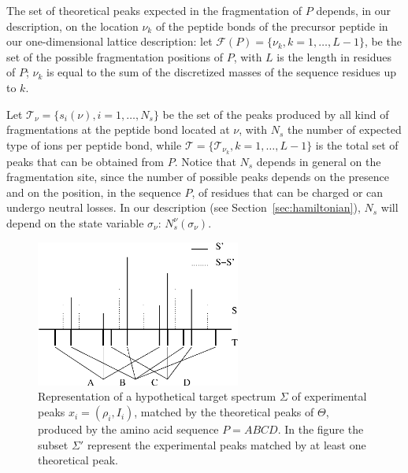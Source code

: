 The set of theoretical peaks expected in the fragmentation of %
$P$ depends, in our description, on the location $\nu_k$ of the peptide bonds of
the precursor peptide in our one-dimensional lattice description: let $\mathcal
F(P)= \{\nu_k,k=1,\dots,L-1\}$, be the set of the possible fragmentation
positions of $P$,  with $L$ is the length in residues of $P$;
$\nu_k$ is equal to  the sum of the discretized masses of
the sequence residues up to $k$. 
 
Let $\mathcal T_\nu=\{s_i(\nu),i=1,\dots,N_s\}$ be the set of the
peaks produced by all kind of fragmentations at the peptide bond located  at
$\nu$, with  $N_s$ the number of expected type of ions per peptide bond,
while $\mathcal T=\{\mathcal T_{\nu_k},k=1,\dots,L-1\}$ is 
the total set of peaks that can be obtained from  $P$.
Notice that $N_s$ depends in general on the fragmentation site, since the number
of possible peaks depends on the presence and on the position, in the sequence
$P$, of residues that can be charged or can undergo neutral losses. In our
description (see Section~\ref{sec:hamiltonian}), $N_s$ will depend on the state variable
$\sigma_\nu$: $N_s^\nu(\sigma_\nu)$.


\begin{figure}[!thb]
\begin{center}
\includegraphics[width=0.6\textwidth]{./img/spectrum_sigma_theta.eps}
\caption{\label{fig:spec-ex}
Representation of a hypothetical target spectrum $\Sigma$ of experimental peaks
$x_i=(\rho_i,I_i)$, matched by the theoretical peaks of $\Theta$,
produced by the amino acid sequence $P=ABCD$.
In the figure the subset $\Sigma'$ represent the experimental peaks matched by
at least one theoretical peak.}
\end{center}
\end{figure}

